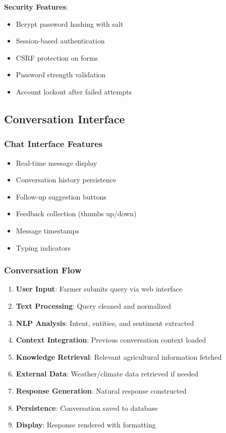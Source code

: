 \documentclass[12pt,a4paper]{article}
\begin{document}
\textbf{Security Features}:
\begin{itemize}[leftmargin=*]
    \item Bcrypt password hashing with salt
    \item Session-based authentication
    \item CSRF protection on forms
    \item Password strength validation
    \item Account lockout after failed attempts
\end{itemize}

\subsection{Conversation Interface}

\subsubsection{Chat Interface Features}

\begin{itemize}[leftmargin=*]
    \item Real-time message display
    \item Conversation history persistence
    \item Follow-up suggestion buttons
    \item Feedback collection (thumbs up/down)
    \item Message timestamps
    \item Typing indicators
\end{itemize}

\subsubsection{Conversation Flow}

\begin{enumerate}[leftmargin=*]
    \item \textbf{User Input}: Farmer submits query via web interface
    \item \textbf{Text Processing}: Query cleaned and normalized
    \item \textbf{NLP Analysis}: Intent, entities, and sentiment extracted
    \item \textbf{Context Integration}: Previous conversation context loaded
    \item \textbf{Knowledge Retrieval}: Relevant agricultural information fetched
    \item \textbf{External Data}: Weather/climate data retrieved if needed
    \item \textbf{Response Generation}: Natural response constructed
    \item \textbf{Persistence}: Conversation saved to database
    \item \textbf{Display}: Response rendered with formatting
\end{enumerate}
\end{document}
